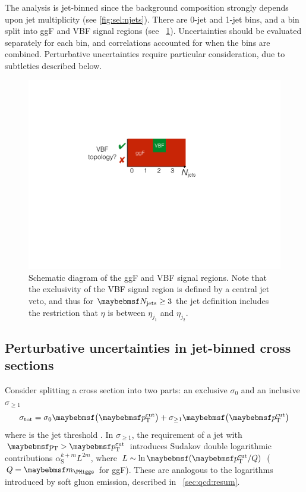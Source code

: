 
The analysis is jet-binned since the background composition strongly depends upon jet 
multiplicity (see \Figure\ref{fig:sel:njets}). There are 0-jet and 1-jet bins, and a 
\twojet bin split into ggF and VBF signal regions (see 
\Figure~\ref{fig:sig:jetbinning}). Uncertainties should be evaluated separately for each 
bin, and correlations accounted for when the bins are combined. Perturbative 
uncertainties require particular consideration, due to subtleties described below.

\begin{figure}
	\includegraphics[width=\mediumfigwidth,clip=true,trim=8.5cm 13.1cm 12.1cm 8.4cm]{custom_images/signal_jetbin}
	\caption{Schematic diagram of the ggF and VBF signal regions. Note that the 
	exclusivity of the VBF signal region is defined by a central jet veto, and thus 
	for $\njets \geq 3$ the jet definition includes the restriction that $\eta$ is 
	between $\eta_{j_1}$ and $\eta_{j_2}$.}
	\label{fig:sig:jetbinning}
\end{figure}



\subsection{Perturbative uncertainties in jet-binned cross sections}
\label{sec:ggF:naive}

Consider splitting a cross section into two parts: an exclusive $\sigma_0$ and an 
inclusive $\sigma_{\geq1}$
\begin{equation}
	\sigma_{\total} = \sigma_0 \parenths{\ptcut} + \sigma_{\geq1} \parenths{\ptcut}
\end{equation}
where \ptcut is the jet \pt threshold \cite{YR2}. In $\sigma_{\geq1}$, the requirement of 
a jet with $\pt > \ptcut$ introduces Sudakov double logarithmic contributions 
$\alpha_{\text{S}}^{k+m} L^{2m}$, where $L \sim \ln\parenths{\ptcut/Q}$ ($Q = \mH$ for 
ggF). These are analogous to the logarithms introduced by soft gluon emission, 
described in \Section~\ref{sec:qcd:resum}. 


